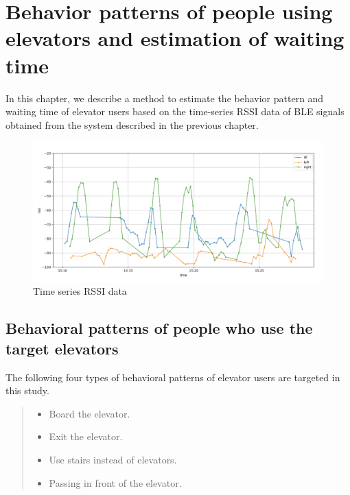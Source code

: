 
\section{Behavior patterns of people using elevators and estimation of waiting time}
In this chapter, we describe a method to estimate the behavior pattern and waiting time of elevator users based on the time-series RSSI data of BLE signals obtained from the system described in the previous chapter.

\begin{figure}[t]
  \centering
  \includegraphics[width=1.0\hsize]{img/ble_rssi_original.png}
  \caption{Time series RSSI data}
  \label{fig:ble_rssi_original}
\end{figure}

\subsection{Behavioral patterns of people who use the target elevators}

The following four types of behavioral patterns of elevator users are targeted in this study.

\begin{quote}
  \begin{itemize}
    \item Board the elevator.
    \item Exit the elevator.
    \item Use stairs instead of elevators.
    \item Passing in front of the elevator.
  \end{itemize}
\end{quote}

